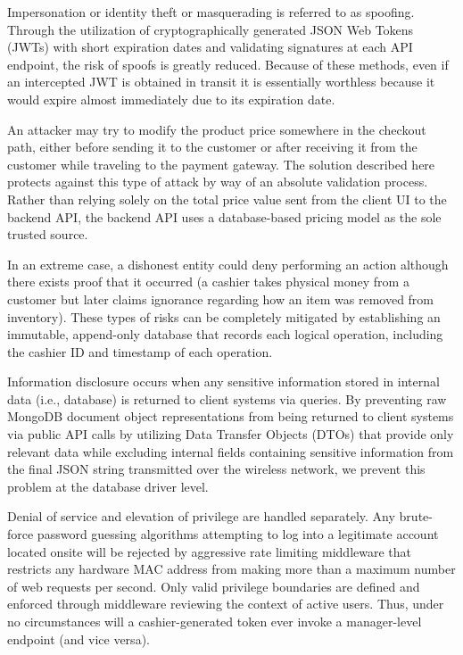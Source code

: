 Impersonation or identity theft or masquerading is referred to as spoofing. Through the utilization of cryptographically generated JSON Web Tokens (JWTs) with short expiration dates and validating signatures at each API endpoint, the risk of spoofs is greatly reduced. Because of these methods, even if an intercepted JWT is obtained in transit it is essentially worthless because it would expire almost immediately due to its expiration date.

An attacker may try to modify the product price somewhere in the checkout path, either before sending it to the customer or after receiving it from the customer while traveling to the payment gateway. The solution described here protects against this type of attack by way of an absolute validation process. Rather than relying solely on the total price value sent from the client UI to the backend API, the backend API uses a database-based pricing model as the sole trusted source.

In an extreme case, a dishonest entity could deny performing an action although there exists proof that it occurred (a cashier takes physical money from a customer but later claims ignorance regarding how an item was removed from inventory). These types of risks can be completely mitigated by establishing an immutable, append-only database that records each logical operation, including the cashier ID and timestamp of each operation.

Information disclosure occurs when any sensitive information stored in internal data (i.e., database) is returned to client systems via queries. By preventing raw MongoDB document object representations from being returned to client systems via public API calls by utilizing Data Transfer Objects (DTOs) that provide only relevant data while excluding internal fields containing sensitive information from the final JSON string transmitted over the wireless network, we prevent this problem at the database driver level.

Denial of service and elevation of privilege are handled separately. Any brute-force password guessing algorithms attempting to log into a legitimate account located onsite will be rejected by aggressive rate limiting middleware that restricts any hardware MAC address from making more than a maximum number of web requests per second. Only valid privilege boundaries are defined and enforced through middleware reviewing the context of active users. Thus, under no circumstances will a cashier-generated token ever invoke a manager-level endpoint (and vice versa).
